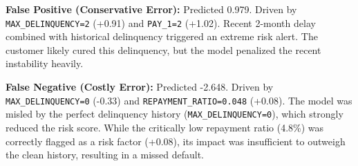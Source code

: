 \documentclass[12pt]{article}
\begin{document}
\noindent\textbf{False Positive (Conservative Error):} Predicted 0.979. Driven by \texttt{MAX\_DELINQUENCY=2} (+0.91) and \texttt{PAY\_1=2} (+1.02). Recent 2-month delay combined with historical delinquency triggered an extreme risk alert. The customer likely cured this delinquency, but the model penalized the recent instability heavily.

\vspace{0.5em}

\noindent\textbf{False Negative (Costly Error):} Predicted -2.648. Driven by \texttt{MAX\_DELINQUENCY=0} (-0.33) and \texttt{REPAYMENT\_RATIO=0.048} (+0.08). The model was misled by the perfect delinquency history (\texttt{MAX\_DELINQUENCY=0}), which strongly reduced the risk score. While the critically low repayment ratio (4.8\%) was correctly flagged as a risk factor (+0.08), its impact was insufficient to outweigh the clean history, resulting in a missed default.
\end{document}
